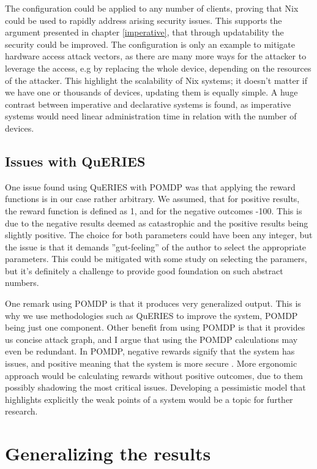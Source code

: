 The configuration could be applied to any number of clients, proving
that Nix could be used to rapidly address arising security
issues. This supports the argument presented in chapter
\ref{imperative}, that through updatability the security could be
improved. The configuration is only an example to mitigate hardware
access attack vectors, as there are many more ways for the attacker to
leverage the access, e.g by replacing the whole device, depending on
the resources of the attacker. This highlight the scalability of Nix
systems; it doesn't matter if we have one or thousands of devices,
updating them is equally simple. A huge contrast between imperative
and declarative systems is found, as imperative systems would need
linear administration time in relation with the number of
devices. 

\subsection{Issues with QuERIES} \label{issues}

One issue found using QuERIES with POMDP was that applying the reward
functions is in our case rather arbitrary. We assumed, that for
positive results, the reward function is defined as 1, and for the
negative outcomes -100. This is due to the negative results deemed as
catastrophic and the positive results being slightly positive. The
choice for both parameters could have been any integer, but the issue
is that it demands ''gut-feeling'' of the author to select the
appropriate parameters. This could be mitigated with some study on
selecting the paramers, but it's definitely a challenge to provide
good foundation on such abstract numbers.

One remark using POMDP is that it produces very generalized
output. This is why we use methodologies such as QuERIES to improve
the system, POMDP being just one component. Other benefit from
using POMDP is that it provides us concise attack graph, and I argue
that using the POMDP calculations may even be redundant. In POMDP, negative rewards
signify that the system has issues, and positive meaning that the
system is more secure \cite{mcabeeMarkov}. More ergonomic approach
would be calculating rewards without positive outcomes, due to them
possibly shadowing the most critical issues. Developing a pessimistic model
that highlights explicitly the weak points of a system would be a
topic for further research.

\section{Generalizing the results}

